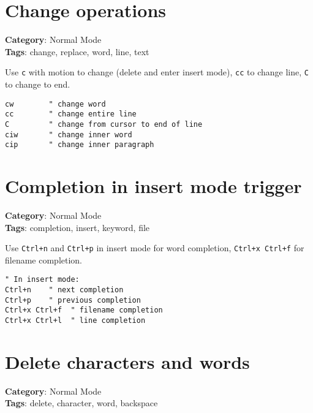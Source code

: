 {{{{{{{{{{\section{Change operations}

\textbf{Category}: Normal Mode\\ \textbf{Tags}: change, replace, word, line, text
\vspace{0.5cm}

Use {\footnotesize \Verb§c§} with motion to change (delete and enter insert mode), {\footnotesize \Verb§cc§} to change line, {\footnotesize \Verb§C§} to change to end.

\begin{Exa*}{}
\begin{Verbatim}[fontsize=\footnotesize, breaklines, breakanywhere]
cw        " change word
cc        " change entire line
C         " change from cursor to end of line
ciw       " change inner word
cip       " change inner paragraph
\end{Verbatim}
\end{Exa*}

\section{Completion in insert mode trigger}

\textbf{Category}: Normal Mode\\ \textbf{Tags}: completion, insert, keyword, file
\vspace{0.5cm}

Use {\footnotesize \Verb§Ctrl+n§} and {\footnotesize \Verb§Ctrl+p§} in insert mode for word completion, {\footnotesize \Verb§Ctrl+x Ctrl+f§} for filename completion.

\begin{Exa*}{}
\begin{Verbatim}[fontsize=\footnotesize, breaklines, breakanywhere]
" In insert mode:
Ctrl+n    " next completion
Ctrl+p    " previous completion
Ctrl+x Ctrl+f  " filename completion
Ctrl+x Ctrl+l  " line completion
\end{Verbatim}
\end{Exa*}

\section{Delete characters and words}

\textbf{Category}: Normal Mode\\ \textbf{Tags}: delete, character, word, backspace
\vspace{0.5cm}

}}}}}}}}}}
